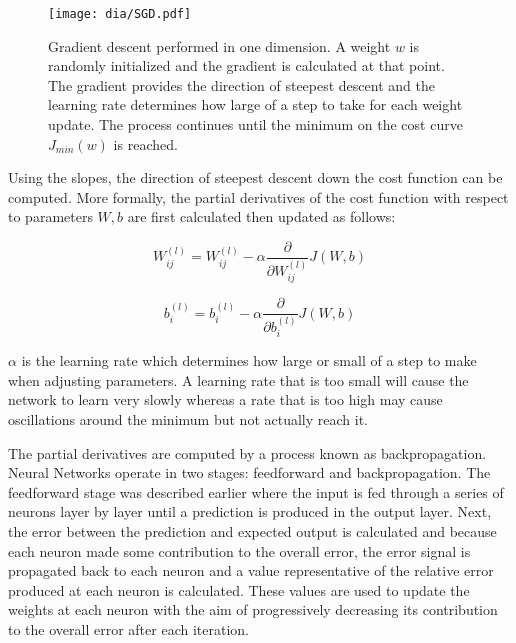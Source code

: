 \documentclass[12pt]{report}
\begin{document}
\begin{figure}[]
\centering
\texttt{[image: dia/SGD.pdf]}
\caption[Gradient descent] {Gradient descent performed in one dimension. A weight $w$ is randomly initialized and the gradient is calculated at that point. The gradient provides the direction of steepest descent and the learning rate determines how large of a step to take for each weight update. The process continues until the minimum on the cost curve $J_{min}(w)$ is reached.}
\end{figure}

Using the slopes, the direction of steepest descent down the cost function can be computed. More formally, the partial derivatives of the cost function with respect to parameters $W, b$ are first calculated then updated as follows:

\begin{equation}
W_{ij}^{(l)} = W_{ij}^{(l)} - \alpha\frac{\partial}{\partial{W_{ij}^{(l)}}}J(W,b)
\end{equation}

\begin{equation}
b_i^{(l)} = b_i^{(l)} - \alpha\frac{\partial}{\partial{b_i^{(l)}}}J(W,b)
\end{equation}

$\alpha$ is the learning rate which determines how large or small of a step to make when adjusting parameters. A learning rate that is too small will cause the network to learn very slowly whereas a rate that is too high may cause oscillations around the minimum but not actually reach it. 

The partial derivatives are computed by a process known as backpropagation.  Neural Networks operate in two stages: feedforward and backpropagation.  The feedforward stage was described earlier where the input is fed through a series of neurons layer by layer until a prediction is produced in the output layer.  Next, the error between the prediction and expected output is calculated and because each neuron made some contribution to the overall error, the error signal is propagated back to each neuron and a value representative of the relative error produced at each neuron is calculated.   These values are used to update the weights at each neuron with the aim of progressively decreasing its contribution to the overall error after each iteration.
\end{document}
